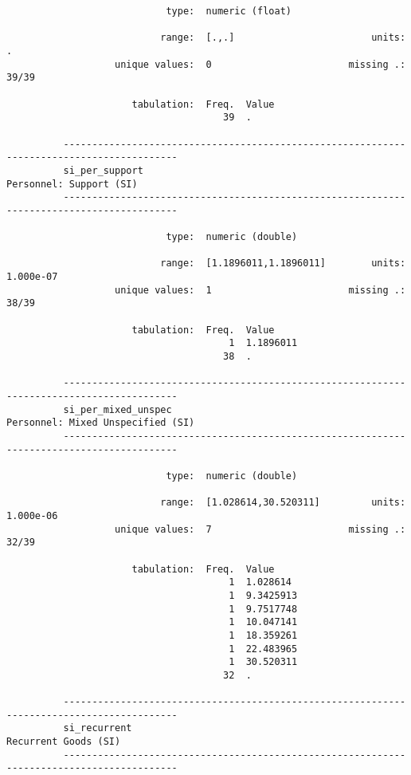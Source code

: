 \documentclass{article}
\begin{document}
\begin{verbatim}
                            type:  numeric (float)
          
                           range:  [.,.]                        units:  .
                   unique values:  0                        missing .:  39/39
          
                      tabulation:  Freq.  Value
                                      39  .
          
          ------------------------------------------------------------------------------------------
          si_per_support                                                     Personnel: Support (SI)
          ------------------------------------------------------------------------------------------
          
                            type:  numeric (double)
          
                           range:  [1.1896011,1.1896011]        units:  1.000e-07
                   unique values:  1                        missing .:  38/39
          
                      tabulation:  Freq.  Value
                                       1  1.1896011
                                      38  .
          
          ------------------------------------------------------------------------------------------
          si_per_mixed_unspec                                      Personnel: Mixed Unspecified (SI)
          ------------------------------------------------------------------------------------------
          
                            type:  numeric (double)
          
                           range:  [1.028614,30.520311]         units:  1.000e-06
                   unique values:  7                        missing .:  32/39
          
                      tabulation:  Freq.  Value
                                       1  1.028614
                                       1  9.3425913
                                       1  9.7517748
                                       1  10.047141
                                       1  18.359261
                                       1  22.483965
                                       1  30.520311
                                      32  .
          
          ------------------------------------------------------------------------------------------
          si_recurrent                                                          Recurrent Goods (SI)
          ------------------------------------------------------------------------------------------
          

\end{verbatim}
\end{document}
